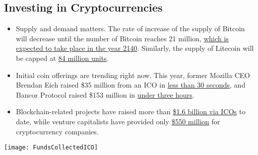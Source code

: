 \documentclass[11pt,fleqn,oneside]{book} %
\begin{document}
	\subsection{Investing in Cryptocurrencies}
		\begin{itemize}
			\item Supply and demand matters. The rate of increase of the supply of Bitcoin will decrease until the number 
			of Bitcoin reaches 21 million, 
			\href{https://www.coindesk.com/top-10-bitcoin-myths-debunked/}{which is expected to take place in the year 2140}. Similarly, 
			the supply of Litecoin will be capped at 
			\href{https://support.xbtce.info/Knowledgebase/Article/View/152/59/about-litecoin}{84 million units}.
			\item Initial coin offerings are trending right now. This year, former Mozilla CEO Brendan Eich raised \$35 
			million from an ICO in 
			\href{https://techcrunch.com/2017/06/01/brave-ico-35-million-30-seconds-brendan-eich/}{less than 30 seconds}, 
			and Bancor Protocol raised \$153 million in 
			\href{https://www.google.com/search?q=Bancor+Protoco+ico&oq=Bancor+Protoco+ico&gs_l=psy-ab.3..0i13k1l2.253.542.0.578.4.3.0.0.0.0.177.320.0j2.2.0....0...1.1.64.psy-ab..3.1.176.LOjRpj0hKrM}{under three hours}.
			\item Blockchain-related projects have raised more than 
			\href{https://www.coindesk.com/1-6-billion-all-time-ico-funding-climbs-as-record-500-million-invested-in-july/}{\$1.6 billion via ICOs} 
			to date, while venture capitalists have provided only 
			\href{http://my.pitchbook.com/?pbr=14763750}{\$550 million} for cryptocurrency companies.
		\end{itemize}
		\begin{center}
			\texttt{[image: FundsCollectedICO]}
		\end{center}
\end{document}
